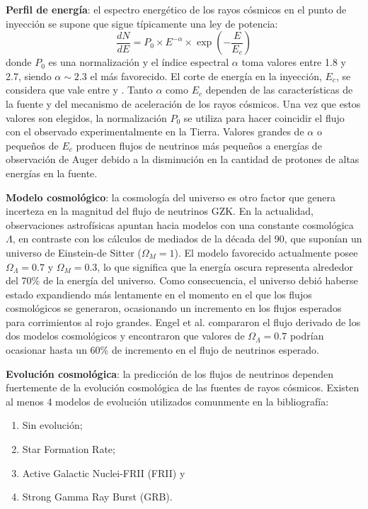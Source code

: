 	\textbf{Perfil de energ\'ia}: el espectro energ\'etico de los rayos c\'osmicos en el punto de inyecci\'on se supone que sigue t\'ipicamente una ley de potencia:
	\begin{equation}
		\frac{dN}{dE}=P_{0} \times E^{-\alpha} \times \exp{(-\frac{E}{E_{c}})}
	\end{equation}
	donde $P_0$ es una normalizaci\'on y el \'indice espectral $\alpha$ toma valores entre 1.8 y 2.7, siendo $\alpha\sim2.3$ el m\'as favorecido.
	El corte de energ\'ia en la inyecci\'on, $E_c$, se considera que vale entre  y .
	Tanto $\alpha$ como $E_c$ dependen de las caracter\'isticas de la fuente y del mecanismo de aceleraci\'on de los rayos c\'osmicos.
	Una vez que estos valores son elegidos, la normalizaci\'on $P_0$ se utiliza para hacer coincidir el flujo con el observado experimentalmente en la Tierra.
	Valores grandes de $\alpha$ o peque\~nos de $E_c$ producen flujos de neutrinos m\'as peque\~nos a energ\'ias de observaci\'on de Auger debido a la disminuci\'on en la cantidad de protones de altas energ\'ias en la fuente.
	
	\textbf{Modelo cosmol\'ogico}: la cosmolog\'ia del universo es otro factor que genera incerteza en la magnitud del flujo de neutrinos GZK. 
	En la actualidad, observaciones astrof\'isicas apuntan hacia modelos con una constante cosmol\'ogica $\Lambda$\cite{cite:Lambda}, en contraste con los c\'alculos de mediados de la d\'ecada del 90, que supon\'ian un universo de Einstein-de Sitter ($\Omega_{M}=1$). 
	El modelo favorecido actualmente posee $\Omega_{\Lambda}=0.7$ y $\Omega_{M}=0.3$\cite{cite:LambdaM}, lo que significa que la energ\'ia oscura representa alrededor del 70\% de la energ\'ia del universo.
	Como consecuencia, el universo debi\'o haberse estado expandiendo más lentamente en el momento en el que los flujos cosmol\'ogicos se generaron, ocasionando un incremento en los flujos esperados para corrimientos al rojo grandes.
	Engel et al. \cite{cite:nuEngel} compararon el flujo derivado de los dos modelos cosmol\'ogicos y encontraron que valores de $\Omega_{\Lambda}=0.7$ podr\'ian ocasionar hasta un 60\% de incremento en el flujo de neutrinos esperado.
	
	\textbf{Evoluci\'on cosmol\'ogica}: la predicci\'on de los flujos de neutrinos dependen fuertemente de la evoluci\'on cosmol\'ogica de las fuentes de rayos c\'osmicos.
	Existen al menos 4 modelos de evoluci\'on utilizados comunmente en la bibliograf\'ia:
	\begin{enumerate}
	 \item Sin evoluci\'on;
	 \item Star Formation Rate;
	 \item Active Galactic Nuclei-FRII (FRII) y
	 \item Strong Gamma Ray Burst (GRB).
	\end{enumerate}
	
